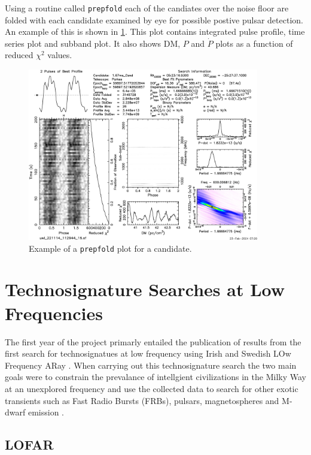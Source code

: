 Using a routine called \texttt{prepfold} each of the candiates over the noise floor are folded with each candidate examined by eye for possible postive pulsar detection. An example of this is shown in \cref{fig: prepfold}. This plot contains integrated pulse profile, time series plot and subband plot. It also shows DM, $P$ and $\dot P$ plots as a function of reduced $\chi^2$ values. 

\begin{figure}
    \centering
    \includegraphics[width = 0.9\textwidth]{figs/prepfold.png}
    \caption{Example of a \texttt{prepfold} plot for a candidate.}
    \label{fig: prepfold}
\end{figure}

\section{Technosignature Searches at Low Frequencies} \label{sec:method-technosignature-searches}

The first year of the project primarly entailed the publication \citep{johnson_simultaneous_2023} of results from the first search for technosignatues at low frequency using Irish and Swedish LOw Frequency ARay \citep[I-LOFAR;][] {van_haarlem_lofar_2013}. When carrying out this technosignature search the two main goals were to constrain the prevalance of intellgient civilizations in the Milky Way at an unexplored frequency and use the collected data to search for other exotic transients such as Fast Radio Bursts (FRBs), pulsars, magnetospheres and M-dwarf emission \citep{sheikh_nine_2020}. 

\subsection{LOFAR}

